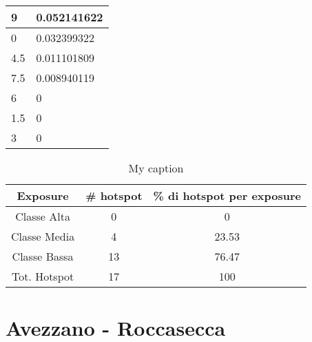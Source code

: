 \begin{table}[H]
\begin{tabular}{|l|l|}
		9                                                         & 0.052141622                                                    \\ \hline
		\rowcolor[HTML]{009901} 
		0                                                         & 0.032399322                                                    \\ \hline
		\rowcolor[HTML]{009901} 
		4.5                                                       & 0.011101809                                                    \\ \hline
		\rowcolor[HTML]{009901} 
		7.5                                                       & 0.008940119                                                    \\ \hline
		\rowcolor[HTML]{009901} 
		6                                                         & 0                                                              \\ \hline
		\rowcolor[HTML]{009901} 
		1.5                                                       & 0                                                              \\ \hline
		\rowcolor[HTML]{009901} 
		3                                                         & 0                                                              \\ \hline
	\end{tabular}
\end{table}

\begin{table}[H]
	\centering
	\caption{My caption}
	\label{risultati_roma_pescara}
	\begin{tabular}{|c|c|c|}
		\hline
		\rowcolor[HTML]{C0C0C0} 
		\textbf{Exposure} & \textbf{\# hotspot} & \textbf{\% di hotspot per exposure} \\ \hline
		Classe Alta       & 0                  & 0                                   \\ \hline
		Classe Media      & 4                 & 23.53                           \\ \hline
		Classe Bassa      & 13              & 76.47                               \\ \hline
		Tot. Hotspot      & 17               & 100                                 \\ \hline
	\end{tabular}
\end{table}


\section{Avezzano - Roccasecca}

